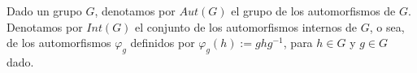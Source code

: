 \question 
Dado un grupo $G$, denotamos por $Aut(G)$ el grupo de los automorfismos de $G$. 
Denotamos por $Int(G)$ el conjunto de los automorfismos internos de $G$, o sea, 
de los automorfismos $\varphi_g$ definidos por $\varphi_g(h):=ghg^{-1}$, 
para $h \in G$ y $g \in G$ dado.
